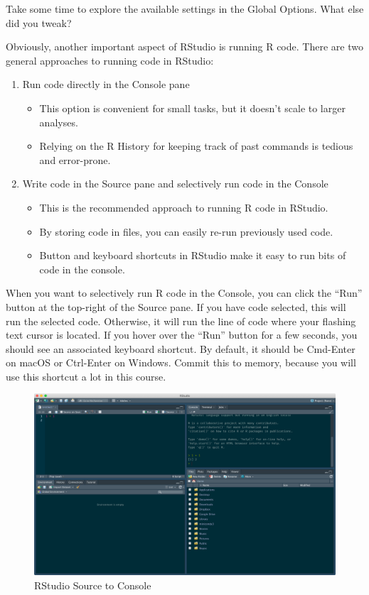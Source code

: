 \documentclass[
]{article}
\providecommand{\tightlist}{%
  \setlength{\itemsep}{0pt}\setlength{\parskip}{0pt}}
\begin{document}
Take some time to explore the available settings in the Global Options.
What else did you tweak?

Obviously, another important aspect of RStudio is running R code. There
are two general approaches to running code in RStudio:

\begin{enumerate}
\def\labelenumi{\arabic{enumi}.}
\tightlist
\item
  Run code directly in the Console pane

  \begin{itemize}
  \tightlist
  \item
    This option is convenient for small tasks, but it doesn't scale to
    larger analyses.
  \item
    Relying on the R History for keeping track of past commands is
    tedious and error-prone.
  \end{itemize}
\item
  Write code in the Source pane and selectively run code in the Console

  \begin{itemize}
  \tightlist
  \item
    This is the recommended approach to running R code in RStudio.
  \item
    By storing code in files, you can easily re-run previously used
    code.
  \item
    Button and keyboard shortcuts in RStudio make it easy to run bits of
    code in the console.
  \end{itemize}
\end{enumerate}

When you want to selectively run R code in the Console, you can click
the ``Run'' button at the top-right of the Source pane. If you have code
selected, this will run the selected code. Otherwise, it will run the
line of code where your flashing text cursor is located. If you hover
over the ``Run'' button for a few seconds, you should see an associated
keyboard shortcut. By default, it should be Cmd-Enter on macOS or
Ctrl-Enter on Windows. Commit this to memory, because you will use this
shortcut a lot in this course.

\begin{figure}
\centering
\includegraphics{screenshots/run.png}
\caption{RStudio Source to Console}
\end{figure}
\end{document}

